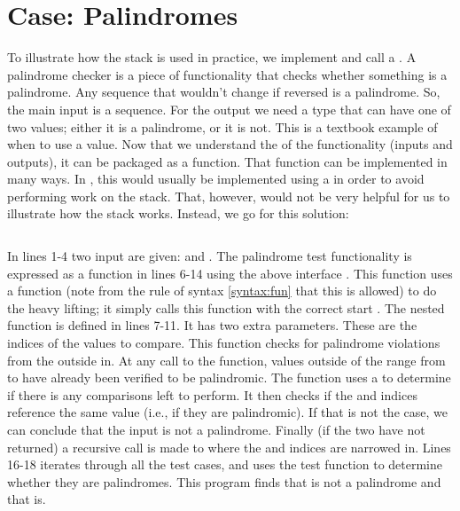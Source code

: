 \section{Case: Palindromes}

To illustrate how the stack is used in practice, we implement and call a  . A palindrome checker is a piece of functionality that checks whether something is a palindrome. Any sequence that wouldn't change if reversed is a palindrome. So, the main input is a sequence. For the output we need a type that can have one of two values; either it is a palindrome, or it is not. This is a textbook example of when to use a  value. Now that we understand the  of the functionality (inputs and outputs), it can be packaged as a function. That function can be implemented in many ways. In \csharp, this would usually be implemented using a  in order to avoid performing work on the stack. That, however, would not be very helpful for us to illustrate how the stack works. Instead, we go for this  solution:

\inputminted[linenos]{csharp}{../src/csharp/functions/palindrome/Program.cs}

In lines 1-4 two input  are given:  and . The palindrome test functionality is expressed as a function in lines 6-14 using the above interface . This function uses a  function (note from the  rule of syntax \ref{syntax:fun} that this is allowed) to do the heavy lifting; it simply calls this function with the correct start . The nested function is defined in lines 7-11. It has two extra parameters. These are the indices of the values to compare. This function checks for palindrome violations from the outside in. At any call to the function, values outside of the range from  to  have already been verified to be palindromic. The function uses a  to determine if there is any comparisons left to perform. It then checks if the  and  indices reference the same value (i.e., if they are palindromic). If that is not the case, we can conclude that the input is not a palindrome. Finally (if the two  have not returned) a recursive call is made to  where the  and  indices are narrowed in. Lines 16-18 iterates through all the test cases, and uses the test function to determine whether they are palindromes. This program finds that  is not a palindrome and that  is.


